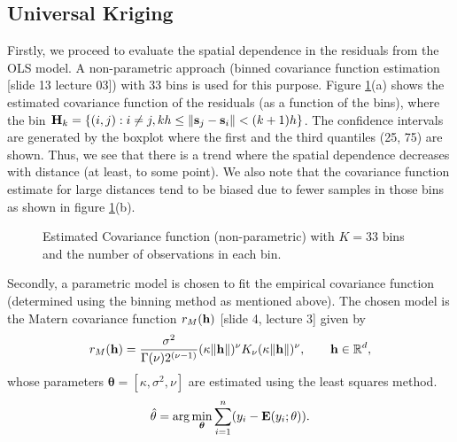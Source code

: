 \documentclass[a4paper,10pt]{article}
\def\bE{{\bf E}}
\def\bH{{\bf H}}
\def\bs{{\bf s}}
\def\bh{{\bf h}}
\def\btheta{{\boldsymbol \theta}}
\begin{document}
\subsection{Universal Kriging}
Firstly, we proceed to evaluate the spatial dependence in the residuals from the OLS model. A non-parametric approach (binned covariance function estimation [slide 13 lecture 03]) with 33 bins is used for this purpose. Figure \ref{fig:covnp}(a) shows the estimated covariance function of the residuals (as a function of the bins), where the bin $\bH_k = \{ (i,j): i \ne j, kh \le \| \bs_j - \bs_i \| < (k+1)h \}$. The confidence intervals are generated by the boxplot where the first and the third quantiles (25, 75) are shown. Thus, we see that there is a trend where the spatial dependence decreases with distance (at least, to some point). We also note that the covariance function estimate for large distances tend to be biased due to fewer samples in those bins as shown in figure  \ref{fig:covnp}(b).
\begin{figure}[ht]
\centering
  \qquad
  \caption{Estimated Covariance function (non-parametric) with $K = 33$ bins and the number of observations in each bin.}
\label{fig:covnp}
\end{figure}
Secondly, a parametric model is chosen to fit the empirical covariance function (determined using the binning method as mentioned above). The chosen model is the Matern covariance function $r_M(\bh)$ [slide 4, lecture 3] given by  
\begin{equation*}
r_M(\bh) = \frac{\sigma^2}{\Gamma(\nu) 2^{(\nu - 1)}} (\kappa \| \bh \|)^{\nu} K_{\nu}(\kappa \| \bh \|)^{\nu}, \qquad \bh \in \mathbb{R}^d,
\end{equation*}
whose parameters $\btheta = [\kappa, \sigma^2, \nu]$ are estimated using the least squares method.
\begin{equation*}
\hat \theta = \arg \min_{\btheta} \sum_{i=1}^n (y_i - \bE(y_i; \theta)).
\end{equation*}
\end{document}
